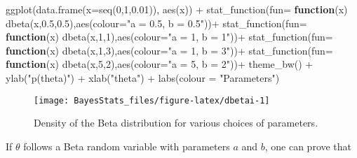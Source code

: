 \documentclass[
]{book}
\newenvironment{Shaded}{\begin{snugshade}}{\end{snugshade}}
\newcommand{\AttributeTok}[1]{\textcolor[rgb]{0.77,0.63,0.00}{#1}}
\newcommand{\ControlFlowTok}[1]{\textcolor[rgb]{0.13,0.29,0.53}{\textbf{#1}}}
\newcommand{\DecValTok}[1]{\textcolor[rgb]{0.00,0.00,0.81}{#1}}
\newcommand{\FloatTok}[1]{\textcolor[rgb]{0.00,0.00,0.81}{#1}}
\newcommand{\FunctionTok}[1]{\textcolor[rgb]{0.00,0.00,0.00}{#1}}
\newcommand{\NormalTok}[1]{#1}
\newcommand{\SpecialCharTok}[1]{\textcolor[rgb]{0.00,0.00,0.00}{#1}}
\newcommand{\StringTok}[1]{\textcolor[rgb]{0.31,0.60,0.02}{#1}}
\begin{document}
\begin{Shaded}
\begin{Highlighting}[]
\FunctionTok{ggplot}\NormalTok{(}\FunctionTok{data.frame}\NormalTok{(}\AttributeTok{x=}\FunctionTok{seq}\NormalTok{(}\DecValTok{0}\NormalTok{,}\DecValTok{1}\NormalTok{,}\FloatTok{0.01}\NormalTok{)), }\FunctionTok{aes}\NormalTok{(x)) }\SpecialCharTok{+}
  \FunctionTok{stat\_function}\NormalTok{(}\AttributeTok{fun=} \ControlFlowTok{function}\NormalTok{(x) }\FunctionTok{dbeta}\NormalTok{(x,}\FloatTok{0.5}\NormalTok{,}\FloatTok{0.5}\NormalTok{),}\FunctionTok{aes}\NormalTok{(}\AttributeTok{colour=}\StringTok{"a = 0.5, b = 0.5"}\NormalTok{))}\SpecialCharTok{+}
     \FunctionTok{stat\_function}\NormalTok{(}\AttributeTok{fun=} \ControlFlowTok{function}\NormalTok{(x) }\FunctionTok{dbeta}\NormalTok{(x,}\DecValTok{1}\NormalTok{,}\DecValTok{1}\NormalTok{),}\FunctionTok{aes}\NormalTok{(}\AttributeTok{colour=}\StringTok{"a = 1, b = 1"}\NormalTok{))}\SpecialCharTok{+}
    \FunctionTok{stat\_function}\NormalTok{(}\AttributeTok{fun=} \ControlFlowTok{function}\NormalTok{(x) }\FunctionTok{dbeta}\NormalTok{(x,}\DecValTok{1}\NormalTok{,}\DecValTok{3}\NormalTok{),}\FunctionTok{aes}\NormalTok{(}\AttributeTok{colour=}\StringTok{"a = 1, b = 3"}\NormalTok{))}\SpecialCharTok{+}
    \FunctionTok{stat\_function}\NormalTok{(}\AttributeTok{fun=} \ControlFlowTok{function}\NormalTok{(x) }\FunctionTok{dbeta}\NormalTok{(x,}\DecValTok{5}\NormalTok{,}\DecValTok{2}\NormalTok{),}\FunctionTok{aes}\NormalTok{(}\AttributeTok{colour=}\StringTok{"a = 5, b = 2"}\NormalTok{))}\SpecialCharTok{+}
  \FunctionTok{theme\_bw}\NormalTok{() }\SpecialCharTok{+} \FunctionTok{ylab}\NormalTok{(}\StringTok{"p(theta)"}\NormalTok{) }\SpecialCharTok{+} \FunctionTok{xlab}\NormalTok{(}\StringTok{"theta"}\NormalTok{) }\SpecialCharTok{+} \FunctionTok{labs}\NormalTok{(}\AttributeTok{colour =} \StringTok{"Parameters"}\NormalTok{)}
\end{Highlighting}
\end{Shaded}

\begin{figure}

{\centering \texttt{[image: BayesStats\_files/figure-latex/dbetai-1]} 

}

\caption{Density of the Beta distribution for various choices of parameters.}\label{fig:dbetai}
\end{figure}

If \(\theta\) follows a Beta random variable with parameters \(a\) and \(b\), one can prove that
\end{document}
